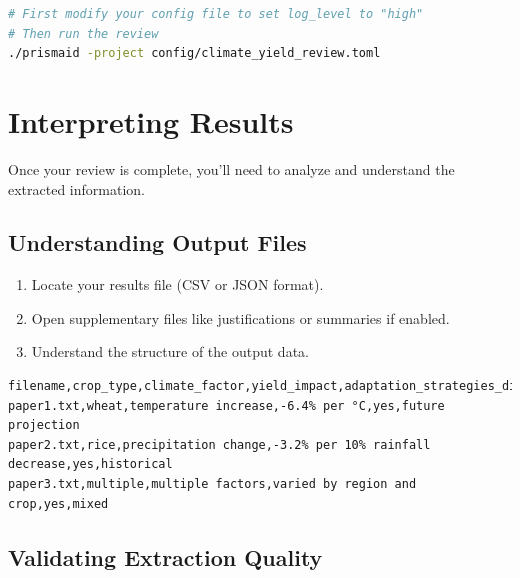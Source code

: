 \begin{commandbox}
\begin{lstlisting}[language=Bash]
# First modify your config file to set log_level to "high"
# Then run the review
./prismaid -project config/climate_yield_review.toml
\end{lstlisting}
\end{commandbox}

\section{Interpreting Results}

Once your review is complete, you'll need to analyze and understand the extracted information.

\subsection{Understanding Output Files}

\begin{enumerate}
    \item Locate your results file (CSV or JSON format).
    \item Open supplementary files like justifications or summaries if enabled.
    \item Understand the structure of the output data.
\end{enumerate}

\begin{infobox}
\begin{lstlisting}
filename,crop_type,climate_factor,yield_impact,adaptation_strategies_discussed,study_timeframe
paper1.txt,wheat,temperature increase,-6.4% per °C,yes,future projection
paper2.txt,rice,precipitation change,-3.2% per 10% rainfall decrease,yes,historical
paper3.txt,multiple,multiple factors,varied by region and crop,yes,mixed
\end{lstlisting}
\end{infobox}


\subsection{Validating Extraction Quality}

